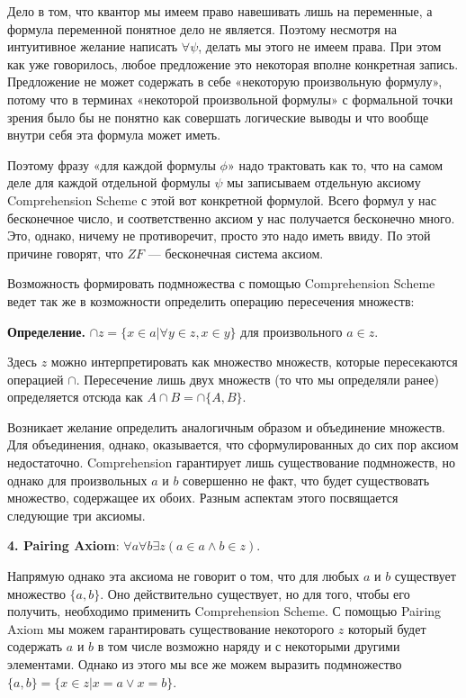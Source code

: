Дело в том, что квантор мы имеем право навешивать лишь на переменные, а формула переменной понятное дело не является. Поэтому несмотря на интуитивное желание написать $\forall\psi$, делать мы этого не имеем права. При этом как уже говорилось, любое предложение это некоторая вполне конкретная запись. Предложение не может содержать в себе «некоторую произвольную формулу», потому что в терминах «некоторой произвольной формулы» с формальной точки зрения было бы не понятно как совершать логические выводы и что вообще внутри себя эта формула может иметь.

Поэтому фразу «для каждой формулы $\phi$» надо трактовать как то, что на самом деле для каждой отдельной формулы $\psi$ мы записываем отдельную аксиому Comprehension Scheme с этой вот конкретной формулой. Всего формул у нас бесконечное число, и соответственно аксиом у нас получается бесконечно много. Это, однако, ничему не противоречит, просто это надо иметь ввиду. По этой причине говорят, что $ZF$ — бесконечная система аксиом.

Возможность формировать подмножества с помощью Comprehension Scheme ведет так же в козможности определить операцию пересечения множеств:

{\bfseries Определение. }$\cap z = \{x \in a| \forall y \in z, x\in y\}$ для произвольного $a \in z$.

Здесь $z$ можно интерпретировать как множество множеств, которые пересекаются операцией $\cap$. Пересечение лишь двух множеств (то что мы определяли ранее) определяется отсюда как $A\cap B = \cap\{A, B\}$.

Возникает желание определить аналогичным образом и объединение множеств. Для объединения, однако, оказывается, что сформулированных до сих пор аксиом недостаточно. Comprehension гарантирует лишь существование подмножеств, но однако для произвольных $a$ и $b$ совершенно не факт, что будет существовать множество, содержащее их обоих. Разным аспектам этого посвящается следующие три аксиомы.

{\bfseries 4. Pairing Axiom}: $\forall a \forall b \exists z (a\in a \wedge b \in z)$.

Напрямую однако эта аксиома не говорит о том, что для любых $a$ и $b$ существует множество $\{a, b\}$. Оно действительно существует, но для того, чтобы его получить, необходимо применить Comprehension Scheme. С помощью Pairing Axiom мы можем гарантировать существование некоторого $z$ который будет содержать $a$ и $b$ в том числе возможно наряду и с некоторыми другими элементами. Однако из этого мы все же можем выразить подмножество $\{a, b\} = \{x \in z| x = a \vee x = b\}$.

